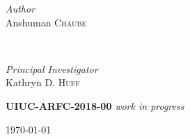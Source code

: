 \documentclass[14pt,a4paper]{article} %
\begin{document}
\begin{titlepage}
\begin{minipage}{0.6\textwidth}
        \end{minipage}

    \vspace{0.2cm}
    \HRule
    \vspace{0.5cm}
    
    
    \begin{minipage}{0.4\textwidth}
        \begin{flushleft}
            \large
            \textit{Author}\\
            Anshuman \textsc{Chaube}\\
        \end{flushleft}
    \end{minipage}
    ~
    \begin{minipage}{0.4\textwidth}
        \begin{flushright}
            \large
            \textit{Principal Investigator}\\
            Kathryn D. \textsc{Huff} %
        \end{flushright}
    \end{minipage}
    

    \vspace{1cm}
    \textsc{\LARGE\bfseries UIUC-ARFC-2018-00} \textit{work in progress} %
    \vspace{0.5cm}
    
    
    \vspace{0.5cm} %
    {\large\today} %
    \vspace{0.5cm}

    

\end{titlepage}
\end{document}
